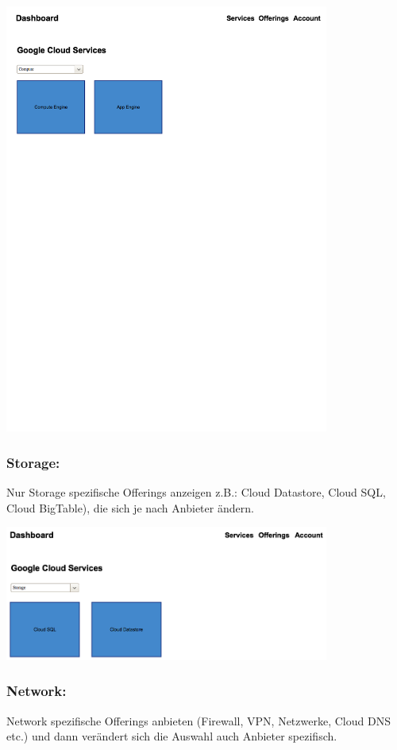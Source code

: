 \documentclass[11pt]{scrartcl}
\begin{document}
  \includegraphics[width=0.8\textwidth]{homescreen_google_compute}



\subsubsection{Storage:}

Nur Storage spezifische Offerings anzeigen z.B.: Cloud Datastore, Cloud SQL, 
Cloud BigTable), die sich je nach Anbieter ändern.

  \includegraphics[width=0.8\textwidth]{homescreen_google_storage}



\subsubsection{Network:}
Network spezifische Offerings anbieten (Firewall, VPN, Netzwerke, Cloud DNS etc.) 
und dann verändert sich die Auswahl auch Anbieter spezifisch.
\end{document}
